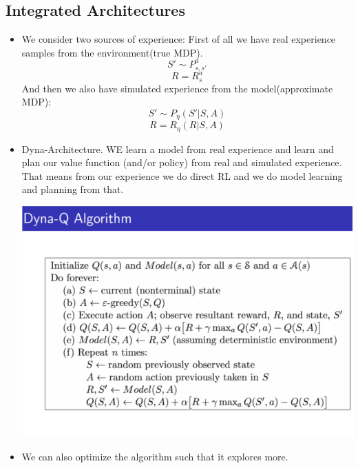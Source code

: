 \documentclass[a4paper]{article}
\begin{document}
    \subsection{Integrated Architectures}
    \begin{itemize}
        \item We consider two sources of experience: First of all we have real experience samples from the environment(true MDP). 
        $$S' \sim P_{s,s'}^a$$
        $$R  = R_s^a$$
        And then we also have simulated experience from the model(approximate MDP):$$S' \sim P_{\eta}(S'|S,A)$$
        $$R = R_{\eta}(R|S,A)$$
        \item Dyna-Architecture. WE learn a model from real experience and learn and plan our value function (and/or policy) from real and simulated experience. That means from our experience we do direct RL and we do model learning and planning from that. 
            \begin{center}
    \includegraphics[width = \textwidth]{images/dyna.png}
        \end{center}
        \item We can also optimize the algorithm such that it explores more.
    \end{itemize}
\end{document}
